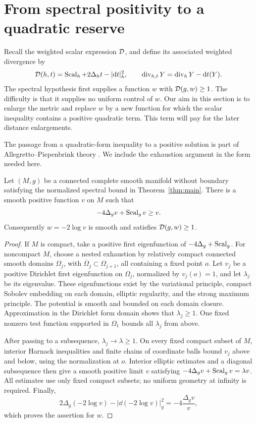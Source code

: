 \section{From spectral positivity to a quadratic reserve}
\label{sec:preprocessing}

Recall the weighted scalar expression $\mathcal D$, and define its associated
weighted divergence by
\begin{equation}\label{pre:drift-scalar}
 \mathcal D(h,t)=\operatorname{Scal}_h+2\Delta_h t-|\mathrm d t|_h^2,
 \qquad
 \operatorname{div}_{h,t}Y=\operatorname{div}_hY-\mathrm d t(Y).
\end{equation}
The spectral hypothesis first supplies a function $w$ with
$\mathcal D(g,w)\ge1$. The difficulty is that it supplies no uniform control
of $w$. Our aim in this section is to enlarge the metric and replace $w$
by a new function for which the scalar inequality contains a positive
quadratic term. This term will pay for the later distance enlargements.

The passage from a quadratic-form inequality to a positive solution is
part of Allegretto--Piepenbrink theory
\cite{Allegretto1974,MossPiepenbrink1978}. We include the exhaustion
argument in the form needed here.

\begin{lemma}\label{pre:supersolution}
Let $(M,g)$ be a connected complete smooth manifold without boundary
satisfying the normalized spectral bound in Theorem~\ref{thm:main}.
There is a smooth positive function $v$ on $M$ such that
\[
 -4\Delta_gv+\operatorname{Scal}_gv\ge v.
\]
Consequently $w=-2\log v$ is smooth and satisfies $\mathcal D(g,w)\ge1$.
\end{lemma}

\begin{proof}
If $M$ is compact, take a positive first eigenfunction of
$-4\Delta_g+\operatorname{Scal}_g$. For noncompact $M$, choose a nested exhaustion
by relatively compact connected smooth domains $\Omega_j$, with
$\overline\Omega_j\subset\Omega_{j+1}$, all containing a fixed point $o$.
Let $v_j$ be a positive Dirichlet first eigenfunction on $\Omega_j$,
normalized by $v_j(o)=1$, and let $\lambda_j$ be its eigenvalue.
These eigenfunctions exist by the variational principle, compact Sobolev
embedding on each domain, elliptic regularity, and the strong maximum
principle. The potential is smooth and bounded on each domain closure.
Approximation in the Dirichlet form domain shows that $\lambda_j\ge1$.
One fixed nonzero test function supported in $\Omega_1$ bounds all
$\lambda_j$ from above.

After passing to a subsequence, $\lambda_j\to\lambda\ge1$.
On every fixed compact subset of $M$, interior Harnack inequalities
and finite chains of coordinate balls bound $v_j$ above and below,
using the normalization at $o$. Interior elliptic estimates and a
diagonal subsequence then give a smooth positive limit $v$ satisfying
$-4\Delta_gv+\operatorname{Scal}_gv=\lambda v$. All estimates use only fixed compact
subsets; no uniform geometry at infinity is required. Finally,
\[
 2\Delta_g(-2\log v)-|\dd(-2\log v)|_g^2
       =-4\frac{\Delta_gv}{v},
\]
which proves the assertion for $w$.
\end{proof}

